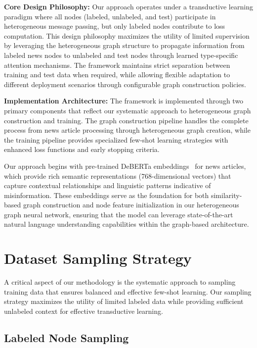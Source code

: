 \textbf{Core Design Philosophy:} Our approach operates under a transductive learning paradigm where all nodes (labeled, unlabeled, and test) participate in heterogeneous message passing, but only labeled nodes contribute to loss computation. This design philosophy maximizes the utility of limited supervision by leveraging the heterogeneous graph structure to propagate information from labeled news nodes to unlabeled and test nodes through learned type-specific attention mechanisms. The framework maintains strict separation between training and test data when required, while allowing flexible adaptation to different deployment scenarios through configurable graph construction policies.

\textbf{Implementation Architecture:} The framework is implemented through two primary components that reflect our systematic approach to heterogeneous graph construction and training. The graph construction pipeline handles the complete process from news article processing through heterogeneous graph creation, while the training pipeline provides specialized few-shot learning strategies with enhanced loss functions and early stopping criteria.

Our approach begins with pre-trained DeBERTa embeddings~\cite{he2021deberta} for news articles, which provide rich semantic representations (768-dimensional vectors) that capture contextual relationships and linguistic patterns indicative of misinformation. These embeddings serve as the foundation for both similarity-based graph construction and node feature initialization in our heterogeneous graph neural network, ensuring that the model can leverage state-of-the-art natural language understanding capabilities within the graph-based architecture.

\section{Dataset Sampling Strategy}

A critical aspect of our methodology is the systematic approach to sampling training data that ensures balanced and effective few-shot learning. Our sampling strategy maximizes the utility of limited labeled data while providing sufficient unlabeled context for effective transductive learning.

\subsection{Labeled Node Sampling}

